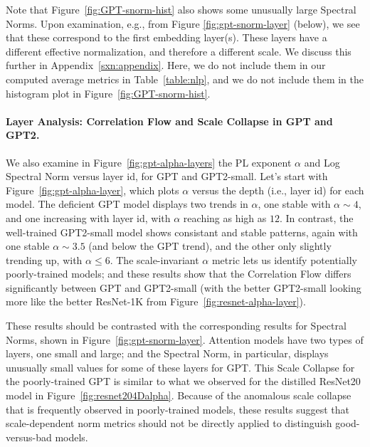 Note that Figure~\ref{fig:GPT-snorm-hist} also shows some unusually large Spectral Norms.
Upon examination, e.g., from Figure \ref{fig:gpt-snorm-layer} (below), we see that these correspond to the first embedding layer(s).
These layers have a different effective normalization, and therefore a different scale.
We discuss this further in Appendix~\ref{sxn:appendix}.
Here, we do not include them in our computed average metrics in Table~\ref{table:nlp}, and we do not include them in the histogram plot in Figure~\ref{fig:GPT-snorm-hist}.



\paragraph{Layer Analysis: Correlation Flow and Scale Collapse in GPT and GPT2.} 

We also examine in Figure~\ref{fig:gpt-alpha-layers} the PL exponent $\alpha$ and Log Spectral Norm versus layer id, for GPT and GPT2-small.
Let's start with Figure~\ref{fig:gpt-alpha-layer}, which plots $\alpha$ versus the depth (i.e., layer id) for each model.
The deficient GPT model displays two trends in $\alpha$, one stable with $\alpha\sim 4$, and one increasing with layer id, with $\alpha$ reaching as high as $12$.
In contrast, the well-trained GPT2-small model shows consistant and stable patterns, again with one stable $\alpha\sim 3.5$ (and below the GPT trend), and the other only slightly trending up, with $\alpha\le 6$. 
The scale-invariant $\alpha$ metric lets us identify potentially poorly-trained models; and these results show that the Correlation Flow differs significantly between GPT and GPT2-small (with the better GPT2-small looking more like the better ResNet-1K from Figure~\ref{fig:resnet-alpha-layer}).

These results should be contrasted with the corresponding results for Spectral Norms, shown in Figure~\ref{fig:gpt-snorm-layer}.
Attention models have two types of layers, one small and large; and the Spectral Norm, in particular, displays unusually small values for some of these layers for GPT.
This Scale Collapse for the poorly-trained GPT is similar to what we observed for the distilled ResNet20 model in Figure~\ref{fig:resnet204Dalpha}.
Because of the anomalous scale collapse that is frequently observed in poorly-trained models, these results suggest that scale-dependent norm metrics should not be directly applied to distinguish good-versus-bad models. 


